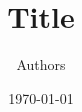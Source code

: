 \documentclass[a4paper,twoside,11pt]{scrartcl}
\begin{document}
\title{Title}
\author{Authors}
\date{\today}
\maketitle
\tableofcontents
\thispagestyle{empty}
\cleardoublepage

\end{document}
